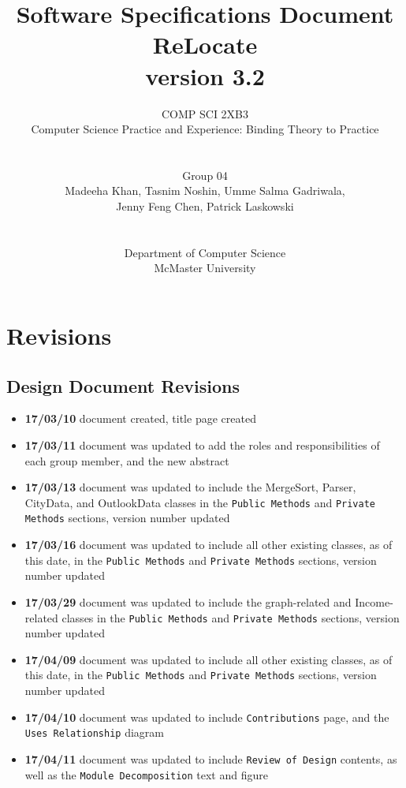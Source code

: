 \documentclass[12pt,fleqn]{article}
\title{Software Specifications Document \\ReLocate\\version 3.2}
\author{COMP SCI 2XB3\\  
Computer Science Practice and Experience: Binding Theory to Practice\\ \\ \\
Group 04\\Madeeha Khan, Tasnim Noshin, Umme Salma Gadriwala,\\ 
Jenny Feng Chen, Patrick Laskowski \\ \\ \\
Department of Computer Science\\ 
McMaster University}
\begin{document}
\maketitle

\newpage
\section*{Revisions}\label{revisions}
\subsection*{Design Document Revisions}
\begin{itemize}
\item \textbf{17/03/10} document created, title page created
\item \textbf{17/03/11} document was updated to add the roles and responsibilities of each group member, and the new abstract
\item \textbf{17/03/13} document was updated to include the MergeSort, Parser, CityData, and OutlookData classes in the \texttt{Public Methods} and \texttt{Private Methods} sections, version number updated
\item \textbf{17/03/16} document was updated to include all other existing classes, as of this date, in the \texttt{Public Methods} and \texttt{Private Methods} sections, version number updated
\item \textbf{17/03/29} document was updated to include the graph-related and Income-related classes in the \texttt{Public Methods} and \texttt{Private Methods} sections, version number updated
\item \textbf{17/04/09} document was updated to include all other existing classes, as of this date, in the \texttt{Public Methods} and \texttt{Private Methods} sections, version number updated
\item \textbf{17/04/10} document was updated to include \texttt{Contributions} page, and the \texttt{Uses Relationship} diagram
\item \textbf{17/04/11} document was updated to include \texttt{Review of Design} contents, as well as the \texttt{Module Decomposition} text and figure\\
\end{itemize}
\end{document}
